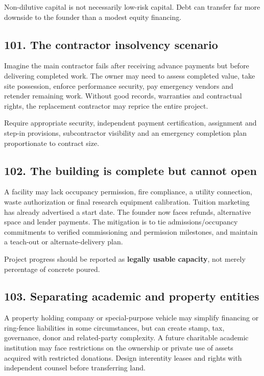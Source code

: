 Non-dilutive capital is not necessarily low-risk capital. Debt can transfer far more downside to the founder than a modest equity financing.


\subsection{101. The contractor insolvency scenario}

Imagine the main contractor fails after receiving advance payments but before delivering completed work. The owner may need to assess completed value, take site possession, enforce performance security, pay emergency vendors and retender remaining work. Without good records, warranties and contractual rights, the replacement contractor may reprice the entire project.

Require appropriate security, independent payment certification, assignment and step-in provisions, subcontractor visibility and an emergency completion plan proportionate to contract size.


\subsection{102. The building is complete but cannot open}

A facility may lack occupancy permission, fire compliance, a utility connection, waste authorization or final research equipment calibration. Tuition marketing has already advertised a start date. The founder now faces refunds, alternative space and lender payments. The mitigation is to tie admissions/occupancy commitments to verified commissioning and permission milestones, and maintain a teach-out or alternate-delivery plan.

Project progress should be reported as \textbf{legally usable capacity}, not merely percentage of concrete poured.


\subsection{103. Separating academic and property entities}

A property holding company or special-purpose vehicle may simplify financing or ring-fence liabilities in some circumstances, but can create stamp, tax, governance, donor and related-party complexity. A future charitable academic institution may face restrictions on the ownership or private use of assets acquired with restricted donations. Design interentity leases and rights with independent counsel before transferring land.

